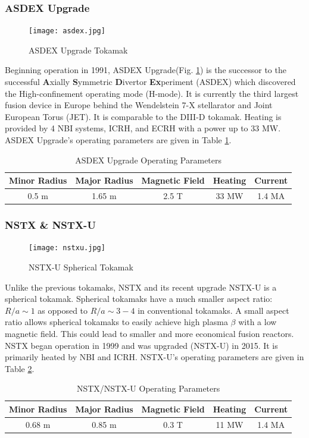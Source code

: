 \subsubsection{ASDEX Upgrade}
\begin{figure}[ht]
    \centering
    \texttt{[image: asdex.jpg]}
    \caption{ASDEX Upgrade Tokamak\cite{geiger2013thesis}}
    \label{fig:augd}
\end{figure}
Beginning operation in 1991, ASDEX Upgrade(Fig. \ref{fig:augd}) is the successor to the successful \textbf{A}xially \textbf{S}ymmetric \textbf{D}ivertor \textbf{Ex}periment (ASDEX) which discovered the High-confinement operating mode (H-mode)\cite{wagner1982hmode}. It is currently the third largest fusion device in Europe behind the Wendelstein 7-X stellarator\cite{wendelstein7x1993} and Joint European Torus (JET)\cite{jet1985}. It is comparable to the DIII-D tokamak. Heating is provided by 4 NBI systems, ICRH, and ECRH with a power up to 33 MW. ASDEX Upgrade's operating parameters are given in Table \ref{tab:augd}. 
\begin{table}[]
    \centering
    \caption{ASDEX Upgrade Operating Parameters}
    \label{tab:augd}
    \begin{tabular}{ccccc}
        \textbf{Minor Radius} & \textbf{Major Radius} & \textbf{Magnetic Field} & \textbf{Heating} & \textbf{Current} \\ \hline \hline
        0.5 m & 1.65 m & 2.5 T & 33 MW & 1.4 MA \\ \hline
    \end{tabular}
\end{table}

\subsubsection{NSTX \& NSTX-U}
\begin{figure}[ht]
    \centering
    \texttt{[image: nstxu.jpg]}
    \caption{NSTX-U Spherical Tokamak}
    \label{fig:nstx}
\end{figure}
Unlike the previous tokamaks, NSTX and its recent upgrade NSTX-U is a spherical tokamak. Spherical tokamaks have a much smaller aspect ratio: $R/a\sim1$ as opposed to $R/a\sim3-4$ in conventional tokamaks. A small aspect ratio allows spherical tokamaks to easily achieve high plasma $\beta$ with a low magnetic field. This could lead to smaller and more economical fusion reactors. NSTX began operation in 1999 and was upgraded (NSTX-U) in 2015. It is primarily heated by NBI and ICRH. NSTX-U's operating parameters are given in Table \ref{tab:nstx}. 
\begin{table}[h!]
    \centering
    \caption{NSTX/NSTX-U Operating Parameters}
    \label{tab:nstx}
    \begin{tabular}{ccccc}
        \textbf{Minor Radius} & \textbf{Major Radius} & \textbf{Magnetic Field} & \textbf{Heating} & \textbf{Current} \\ \hline \hline
        0.68 m & 0.85 m & 0.3 T & 11 MW & 1.4 MA \\ \hline
    \end{tabular}
\end{table}

